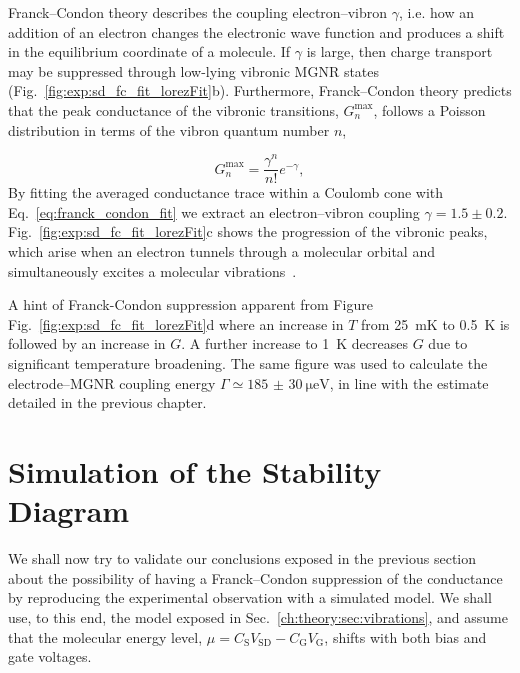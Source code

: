 Franck--Condon theory describes the coupling electron--vibron $\gamma$, i.e. how an addition of an electron changes the electronic wave function and produces a shift in the equilibrium coordinate of a molecule. If $\gamma$ is large, then charge transport may be suppressed through low-lying vibronic MGNR states (Fig.~\ref{fig:exp:sd_fc_fit_lorezFit}b). Furthermore, Franck--Condon theory predicts that the peak conductance of the vibronic transitions, $G_n^{\max }$, follows a Poisson distribution in terms of the vibron quantum number $n$,

\begin{equation}\label{eq:franck_condon_fit}
    G_n^{\max }=\frac{\gamma^n}{n !} e^{-\gamma},
\end{equation}
%    
By fitting the averaged conductance trace within a Coulomb cone with Eq.~\ref{eq:franck_condon_fit} we extract an electron--vibron coupling $\gamma=1.5 \pm 0.2$. Fig.~\ref{fig:exp:sd_fc_fit_lorezFit}c shows the progression of the vibronic peaks, which arise when an electron tunnels through a molecular orbital and simultaneously excites a molecular vibrations~\cite{van2013suppression}.

A hint of Franck-Condon suppression apparent from Figure Fig.~\ref{fig:exp:sd_fc_fit_lorezFit}d where an increase in $T$ from \SI{25}{\milli\kelvin} to \SI{0.5}{\kelvin} is followed by an increase in $G$. A further increase to \SI{1}{\kelvin} decreases $G$ due to significant temperature broadening. The same figure was used to calculate the electrode--\gls{MGNR} coupling energy $\Gamma\simeq\SI[separate-uncertainty = true]{185(30)}{\micro\electronvolt}$, in line with the estimate detailed in the previous chapter.



\section{Simulation of the Stability Diagram}\label{solubility:sec:simulation}

We shall now try to validate our conclusions exposed in the previous section about the possibility of having a Franck--Condon suppression of the conductance by reproducing the experimental observation with a simulated model. We shall use, to this end, the model exposed in Sec.~\ref{ch:theory:sec:vibrations}, and assume that the molecular energy level, $\mu=C_\textrm{S} V_\textrm{SD}-C_\textrm{G} V_\textrm{G}$, shifts with both bias and gate voltages.

